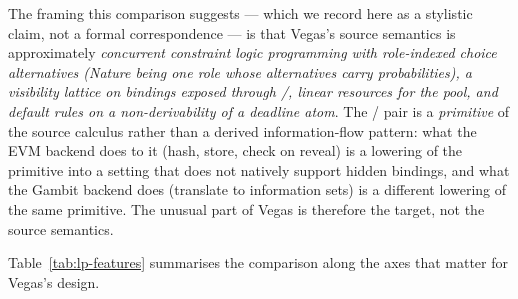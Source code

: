 The framing this comparison suggests --- which we record here as
a stylistic claim, not a formal correspondence --- is that
Vegas's source semantics is approximately \emph{concurrent
constraint logic programming with role-indexed choice
alternatives (Nature being one role whose alternatives carry
probabilities), a visibility lattice on bindings exposed through
/, linear resources for the pool, and
default rules on a non-derivability of a deadline atom}.  The
/ pair is a \emph{primitive} of the source
calculus rather than a derived information-flow pattern: what
the EVM backend does to it (hash, store, check on reveal) is a
lowering of the primitive into a setting that does not natively
support hidden bindings, and what the Gambit backend does
(translate to information sets) is a different lowering of the
same primitive.  The unusual part of Vegas is therefore the
target, not the source semantics.

Table~\ref{tab:lp-features} summarises the comparison along
the axes that matter for Vegas's design.

